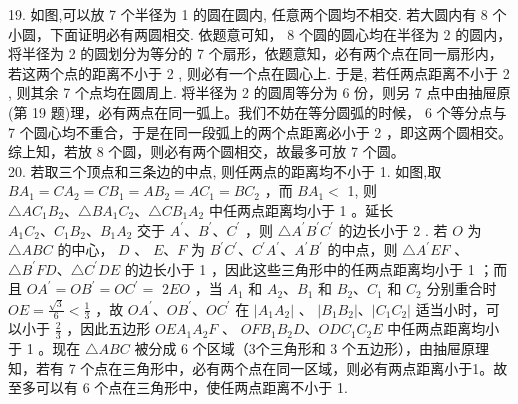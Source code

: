 \documentclass[10pt]{article}
\begin{document}
19. 如图,可以放 7 个半径为 1 的圆在圆内, 任意两个圆均不相交. 若大圆内有 8 个小圆，下面证明必有两圆相交. 依题意可知， 8 个圆的圆心均在半径为 2 的圆内，将半径为 2 的圆划分为等分的 7 个扇形，依题意知，必有两个点在同一扇形内，若这两个点的距离不小于 2 , 则必有一个点在圆心上. 于是, 若任两点距离不小于 2 , 则其余 7 个点均在圆周上. 将半径为 2 的圆周等分为 6 份，则另 7 点中由抽屉原\\
(第 19 题)理，必有两点在同一弧上。我们不妨在等分圆弧的时候， 6 个等分点与 7 个圆心均不重合，于是在同一段弧上的两个点距离必小于 2 ，即这两个圆相交。综上知，若放 8 个圆，则必有两个圆相交，故最多可放 7 个圆。\\
20. 若取三个顶点和三条边的中点, 则任两点的距离均不小于 1. 如图,取\\
$B A_{1}=C A_{2}=C B_{1}=A B_{2}=A C_{1}=B C_{2}$ ，而 $B A_{1}<$ 1, 则 $\triangle A C_{1} B_{2} 、 \triangle B A_{1} C_{2} 、 \triangle C B_{1} A_{2}$ 中任两点距离均小于 1 。延长 $A_{1} C_{2} 、 C_{1} B_{2} 、 B_{1} A_{2}$ 交于 $A^{\prime} 、 B^{\prime} 、 C^{\prime}$ ，则 $\triangle A^{\prime} B^{\prime} C^{\prime}$ 的边长小于 2 . 若 $O$ 为 $\triangle A B C$ 的中心， $D$ 、 $E 、 F$ 为 $B^{\prime} C^{\prime} 、 C^{\prime} A^{\prime} 、 A^{\prime} B^{\prime}$ 的中点，则 $\triangle A^{\prime} E F$ 、 $\triangle B^{\prime} F D 、 \triangle C^{\prime} D E$ 的边长小于 1 ，因此这些三角形中的任两点距离均小于 1 ；而且 $O A^{\prime}=O B^{\prime}=O C^{\prime}=$ $2 E O$ ，当 $A_{1}$ 和 $A_{2} 、 B_{1}$ 和 $B_{2} 、 C_{1}$ 和 $C_{2}$ 分别重合时 $O E=\frac{\sqrt{3}}{6}<\frac{1}{3}$ ，故 $O A^{\prime} 、 O B^{\prime} 、 O C^{\prime}$ 在 $\left|A_{1} A_{2}\right|$ 、 $\left|B_{1} B_{2}\right| 、\left|C_{1} C_{2}\right|$ 适当小时，可以小于 $\frac{2}{3}$ ，因此五边形 $O E A_{1} A_{2} F$ 、 $O F B_{1} B_{2} D 、 O D C_{1} C_{2} E$ 中任两点距离均小于 1 。现在 $\triangle A B C$ 被分成 6 个区域（3个三角形和 3 个五边形），由抽屉原理知，若有 7 个点在三角形中，必有两个点在同一区域，则必有两点距离小于1。故至多可以有 6 个点在三角形中，使任两点距离不小于 1.
\end{document}
